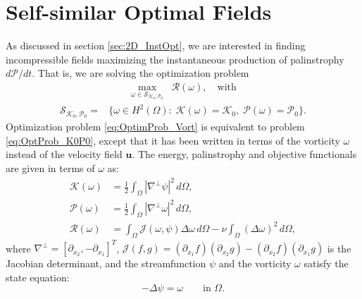 \documentclass[11pt]{article}
\def\J{{\mathcal{J}}}
\def\P{{\mathcal{P}}}
\def\R{{\mathcal{R}}}
\def\K{{\mathcal{K}}}
\newcommand{\uvec}{\mathbf{u}}
\newcommand{\laplacian}{\Delta}
\newcommand{\nablaperp}{\nabla^{\perp}}
\begin{document}
\section{Self-similar Optimal Fields}
\label{sec:SelfSimilarAnalysis}

As discussed in section \ref{sec:2D_InstOpt}, we are interested in finding incompressible fields maximizing the instantaneous production of palinstrophy $d\P/dt$. That is, we are solving the optimization problem
\begin{equation}\label{eq:OptimProb_Vort}
\begin{aligned}
 & \qquad\mathop{\max}_{\omega\in\mathcal{S}_{\K_0,\P_0}} \;\; \R(\omega), 
 \quad {\textrm{with}}\\
\mathcal{S}_{\K_0,\P_0} = & \{ \omega\in H^2(\Omega) :  \;  \K(\omega) = \K_0, \; \P(\omega) = \P_0 \}.
\end{aligned}
\end{equation}
Optimization problem \eqref{eq:OptimProb_Vort} is equivalent to problem \eqref{eq:OptProb_K0P0}, except that it has been written in terms of the vorticity $\omega$ instead of the velocity field $\uvec$. The energy, palinstrophy and objective functionals are given in terms of $\omega$ as:
\begin{subequations}
\begin{align}
\K(\omega) & = \frac{1}{2}\int_\Omega | \nablaperp\psi |^2 \, d\Omega, \\
\P(\omega) & = \frac{1}{2}\int_\Omega | \nablaperp\omega |^2 \, d\Omega,\\
\R(\omega) & = \int_{\Omega}\J(\omega,\psi)\laplacian\omega \, d\Omega - 
\nu \int_{\Omega}\left(\laplacian \omega \right)^2 \, d\Omega,
\end{align}
\end{subequations}    
where $\nablaperp = [\partial_{x_2}, -\partial_{x_1}]^T$,  $\J(f,g) = (\partial_{x_1}f)( \partial_{x_2} g) - (\partial_{x_2} f)( \partial_{x_1} g)$ is the Jacobian determinant, and the streamfunction $\psi$ and the vorticity $\omega$ satisfy the state equation:
\begin{equation}\label{eq:vort2Stream}
-\laplacian\psi = \omega\qquad\mbox{in } \Omega.
\end{equation}
\end{document}
